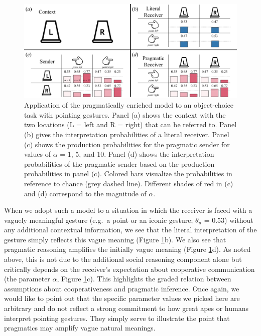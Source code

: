 \documentclass[
  man,floatsintext]{apa6}
\begin{document}
\begin{figure}

{\centering \includegraphics[width=1\linewidth]{./figures/Fig4} 

}

\caption{Application of the pragmatically enriched model to an object-choice task with pointing gestures. Panel (a) shows the context with the two locations (L = left and R = right) that can be referred to. Panel (b) gives the interpretation probabilities of a literal receiver. Panel (c) shows the production probabilities for the pragmatic sender for values of \(\alpha\) = 1, 5, and 10. Panel (d) shows the interpretation probabilities of the pragmatic sender based on the production probabilities in panel (c). Colored bars visualize the probabilities in reference to chance (grey dashed line). Different shades of red in (c) and (d) correspond to the magnitude of \(\alpha\).}\label{fig:fig4}
\end{figure}

When we adopt such a model to a situation in which the receiver is faced with a vaguely meaningful gesture (e.g.~a point or an iconic gesture; \(\theta_{u}\) = 0.53) without any additional contextual information, we see that the literal interpretation of the gesture simply reflects this vague meaning (Figure \ref{fig:fig4}b). We also see that pragmatic reasoning amplifies the initially vague meaning (Figure \ref{fig:fig4}d). As noted above, this is not due to the additional social reasoning component alone but critically depends on the receiver's expectation about cooperative communication (the parameter \(\alpha\), Figure \ref{fig:fig4}c). This highlights the graded relation between assumptions about cooperativeness and pragmatic inference. Once again, we would like to point out that the specific parameter values we picked here are arbitrary and do not reflect a strong commitment to how great apes or humans interpret pointing gestures. They simply serve to illustrate the point that pragmatics may amplify vague natural meanings.
\end{document}
